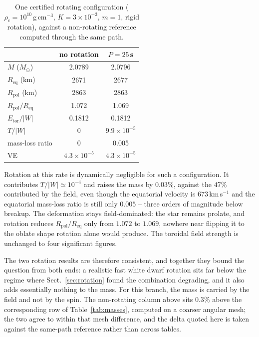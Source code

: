 \documentclass{aa}
\begin{document}
\begin{table}
\caption{One certified rotating configuration
($\rho_c = 10^{10}$\,g\,cm$^{-3}$, $K = 3\times10^{-3}$, $m=1$, rigid
rotation), against a non-rotating reference computed through the same
path.}
\label{tab:rotating}
\centering
\begin{tabular}{l c c}
\hline\hline
 & no rotation & $P = 25$\,s \\
\hline
$M$ ($M_\odot$)                 & 2.0789 & 2.0796 \\
$R_{\mathrm{eq}}$ (km)          & 2671   & 2677 \\
$R_{\mathrm{pol}}$ (km)         & 2863   & 2863 \\
$R_{\mathrm{pol}}/R_{\mathrm{eq}}$ & 1.072 & 1.069 \\
$E_{\mathrm{tor}}/|W|$          & 0.1812 & 0.1812 \\
$T/|W|$                         & 0      & $9.9\times10^{-5}$ \\
mass-loss ratio                 & 0      & 0.005 \\
VE                              & $4.3\times10^{-5}$ & $4.3\times10^{-5}$ \\
\hline
\end{tabular}
\end{table}

Rotation at this rate is dynamically negligible for such a
configuration. It contributes $T/|W| \simeq 10^{-4}$ and raises the mass
by $0.03\%$, against the $47\%$ contributed by the field, even though the
equatorial velocity is $673$\,km\,s$^{-1}$ and the equatorial mass-loss
ratio is still only $0.005$ -- three orders of magnitude below breakup.
The deformation stays field-dominated: the star remains prolate, and
rotation reduces $R_{\mathrm{pol}}/R_{\mathrm{eq}}$ only from $1.072$ to
$1.069$, nowhere near flipping it to the oblate shape rotation alone
would produce. The toroidal field strength is unchanged to four
significant figures.

The two rotation results are therefore consistent, and together they
bound the question from both ends: a realistic fast white dwarf rotation
sits far below the regime where Sect.~\ref{sec:rotation} found the
combination degrading, and it also adds essentially nothing to the mass.
For this branch, the mass is carried by the field and not by the spin.
The non-rotating column above sits $0.3\%$ above the corresponding row of
Table~\ref{tab:masses}, computed on a coarser angular mesh; the two agree
to within that mesh difference, and the delta quoted here is taken
against the same-path reference rather than across tables.
\end{document}
